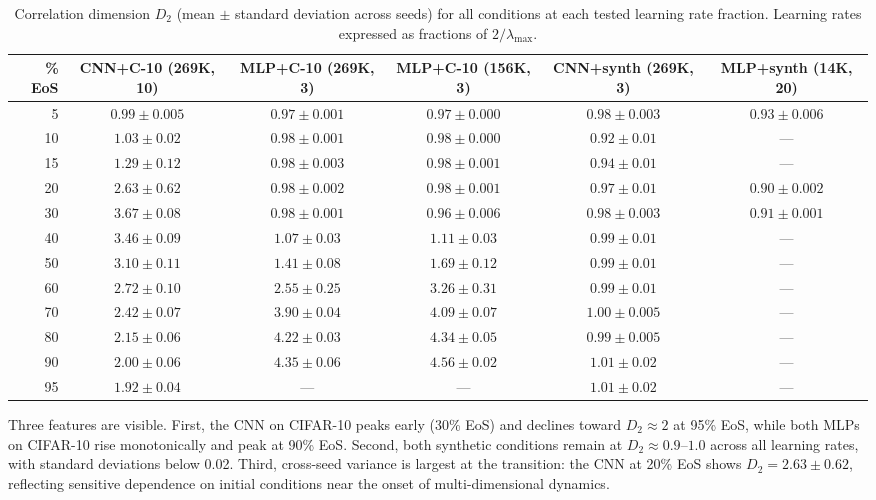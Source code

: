 \documentclass[aps,prl,twocolumn,superscriptaddress]{revtex4-2}
\begin{document}
\begin{table}[t]
\caption{\label{tab:d2_all}%
Correlation dimension $D_2$ (mean $\pm$ standard deviation across seeds) for all conditions at each tested learning rate fraction. Learning rates expressed as fractions of $2/\lambda_{\max}$.}
\begin{ruledtabular}
\begin{tabular}{r|ccccc}
\% EoS & CNN+C-10 (269K, 10) & MLP+C-10 (269K, 3) & MLP+C-10 (156K, 3) & CNN+synth (269K, 3) & MLP+synth (14K, 20)\\
\hline
5 & $0.99 \pm 0.005$ & $0.97 \pm 0.001$ & $0.97 \pm 0.000$ & $0.98 \pm 0.003$ & $0.93 \pm 0.006$\\
10 & $1.03 \pm 0.02$ & $0.98 \pm 0.001$ & $0.98 \pm 0.000$ & $0.92 \pm 0.01$ & ---\\
15 & $1.29 \pm 0.12$ & $0.98 \pm 0.003$ & $0.98 \pm 0.001$ & $0.94 \pm 0.01$ & ---\\
20 & $2.63 \pm 0.62$ & $0.98 \pm 0.002$ & $0.98 \pm 0.001$ & $0.97 \pm 0.01$ & $0.90 \pm 0.002$\\
30 & $\mathbf{3.67 \pm 0.08}$ & $0.98 \pm 0.001$ & $0.96 \pm 0.006$ & $0.98 \pm 0.003$ & $0.91 \pm 0.001$\\
40 & $3.46 \pm 0.09$ & $1.07 \pm 0.03$ & $1.11 \pm 0.03$ & $0.99 \pm 0.01$ & ---\\
50 & $3.10 \pm 0.11$ & $1.41 \pm 0.08$ & $1.69 \pm 0.12$ & $0.99 \pm 0.01$ & ---\\
60 & $2.72 \pm 0.10$ & $2.55 \pm 0.25$ & $3.26 \pm 0.31$ & $0.99 \pm 0.01$ & ---\\
70 & $2.42 \pm 0.07$ & $3.90 \pm 0.04$ & $4.09 \pm 0.07$ & $1.00 \pm 0.005$ & ---\\
80 & $2.15 \pm 0.06$ & $4.22 \pm 0.03$ & $4.34 \pm 0.05$ & $0.99 \pm 0.005$ & ---\\
90 & $2.00 \pm 0.06$ & $\mathbf{4.35 \pm 0.06}$ & $\mathbf{4.56 \pm 0.02}$ & $1.01 \pm 0.02$ & ---\\
95 & $1.92 \pm 0.04$ & --- & --- & $1.01 \pm 0.02$ & ---\\
\end{tabular}
\end{ruledtabular}
\end{table}

Three features are visible. First, the CNN on CIFAR-10 peaks early (30\% EoS) and declines toward $D_2 \approx 2$ at 95\% EoS, while both MLPs on CIFAR-10 rise monotonically and peak at 90\% EoS. Second, both synthetic conditions remain at $D_2 \approx 0.9$--$1.0$ across all learning rates, with standard deviations below 0.02. Third, cross-seed variance is largest at the transition: the CNN at 20\% EoS shows $D_2 = 2.63 \pm 0.62$, reflecting sensitive dependence on initial conditions near the onset of multi-dimensional dynamics.
\end{document}

